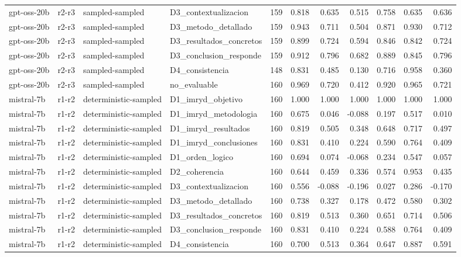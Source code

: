 \begin{table}
\begin{tabular}{llllrrrrrrr}
gpt-oss-20b & r2-r3 & sampled-sampled & D3\_contextualizacion & 159 & 0.818 & 0.635 & 0.515 & 0.758 & 0.635 & 0.636 \\
gpt-oss-20b & r2-r3 & sampled-sampled & D3\_metodo\_detallado & 159 & 0.943 & 0.711 & 0.504 & 0.871 & 0.930 & 0.712 \\
gpt-oss-20b & r2-r3 & sampled-sampled & D3\_resultados\_concretos & 159 & 0.899 & 0.724 & 0.594 & 0.846 & 0.842 & 0.724 \\
gpt-oss-20b & r2-r3 & sampled-sampled & D3\_conclusion\_responde & 159 & 0.912 & 0.796 & 0.682 & 0.889 & 0.845 & 0.796 \\
gpt-oss-20b & r2-r3 & sampled-sampled & D4\_consistencia & 148 & 0.831 & 0.485 & 0.130 & 0.716 & 0.958 & 0.360 \\
gpt-oss-20b & r2-r3 & sampled-sampled & no\_evaluable & 160 & 0.969 & 0.720 & 0.412 & 0.920 & 0.965 & 0.721 \\
mistral-7b & r1-r2 & deterministic-sampled & D1\_imryd\_objetivo & 160 & 1.000 & 1.000 & 1.000 & 1.000 & 1.000 & 1.000 \\
mistral-7b & r1-r2 & deterministic-sampled & D1\_imryd\_metodologia & 160 & 0.675 & 0.046 & -0.088 & 0.197 & 0.517 & 0.010 \\
mistral-7b & r1-r2 & deterministic-sampled & D1\_imryd\_resultados & 160 & 0.819 & 0.505 & 0.348 & 0.648 & 0.717 & 0.497 \\
mistral-7b & r1-r2 & deterministic-sampled & D1\_imryd\_conclusiones & 160 & 0.831 & 0.410 & 0.224 & 0.590 & 0.764 & 0.409 \\
mistral-7b & r1-r2 & deterministic-sampled & D1\_orden\_logico & 160 & 0.694 & 0.074 & -0.068 & 0.234 & 0.547 & 0.057 \\
mistral-7b & r1-r2 & deterministic-sampled & D2\_coherencia & 160 & 0.644 & 0.459 & 0.336 & 0.574 & 0.953 & 0.435 \\
mistral-7b & r1-r2 & deterministic-sampled & D3\_contextualizacion & 160 & 0.556 & -0.088 & -0.196 & 0.027 & 0.286 & -0.170 \\
mistral-7b & r1-r2 & deterministic-sampled & D3\_metodo\_detallado & 160 & 0.738 & 0.327 & 0.178 & 0.472 & 0.580 & 0.302 \\
mistral-7b & r1-r2 & deterministic-sampled & D3\_resultados\_concretos & 160 & 0.819 & 0.513 & 0.360 & 0.651 & 0.714 & 0.506 \\
mistral-7b & r1-r2 & deterministic-sampled & D3\_conclusion\_responde & 160 & 0.831 & 0.410 & 0.224 & 0.588 & 0.764 & 0.409 \\
mistral-7b & r1-r2 & deterministic-sampled & D4\_consistencia & 160 & 0.700 & 0.513 & 0.364 & 0.647 & 0.887 & 0.591 \\

\end{tabular}
\end{table}
